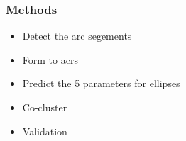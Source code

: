 \documentclass{beamer}
\begin{document}
    \begin{frame}
        \frametitle{Methods}
    
        \begin{itemize}
            \item Detect the arc segements
            \item Form to acrs 
            \item Predict the 5 parameters for ellipses
            \item Co-cluster
            \item Validation
        \end{itemize}
    
    \end{frame}
\end{document}
